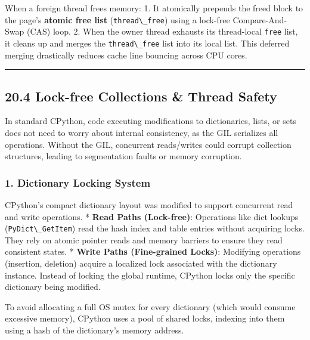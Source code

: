 When a foreign thread frees memory: 1. It atomically prepends the freed
block to the page's \textbf{atomic free list}
(\passthrough{\lstinline!thread\_free!}) using a lock-free
Compare-And-Swap (CAS) loop. 2. When the owner thread exhausts its
thread-local \passthrough{\lstinline!free!} list, it cleans up and
merges the \passthrough{\lstinline!thread\_free!} list into its local
list. This deferred merging drastically reduces cache line bouncing
across CPU cores.

\begin{center}\rule{0.5\linewidth}{0.5pt}\end{center}

\hypertarget{lock-free-collections-thread-safety}{%
\subsection{20.4 Lock-free Collections \& Thread
Safety}\label{lock-free-collections-thread-safety}}

In standard CPython, code executing modifications to dictionaries,
lists, or sets does not need to worry about internal consistency, as the
GIL serializes all operations. Without the GIL, concurrent reads/writes
could corrupt collection structures, leading to segmentation faults or
memory corruption.

\hypertarget{dictionary-locking-system}{%
\subsubsection{1. Dictionary Locking
System}\label{dictionary-locking-system}}

CPython's compact dictionary layout was modified to support concurrent
read and write operations. * \textbf{Read Paths (Lock-free)}: Operations
like dict lookups (\passthrough{\lstinline!PyDict\_GetItem!}) read the
hash index and table entries without acquiring locks. They rely on
atomic pointer reads and memory barriers to ensure they read consistent
states. * \textbf{Write Paths (Fine-grained Locks)}: Modifying
operations (insertion, deletion) acquire a localized lock associated
with the dictionary instance. Instead of locking the global runtime,
CPython locks only the specific dictionary being modified.

To avoid allocating a full OS mutex for every dictionary (which would
consume excessive memory), CPython uses a pool of shared locks, indexing
into them using a hash of the dictionary's memory address.

